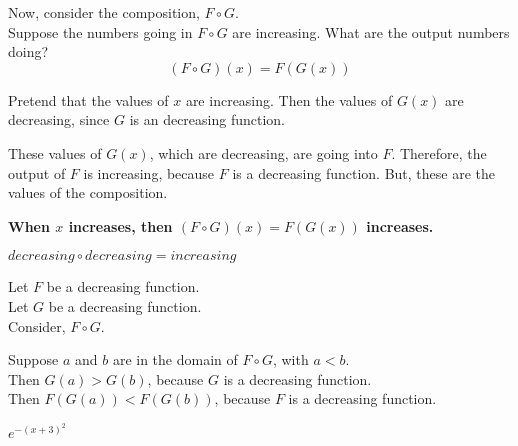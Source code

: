 \documentclass{ximera}
\begin{document}
Now, consider the composition, $F \circ G$. \\


Suppose the numbers going in $F \circ G$ are increasing.  What are the output numbers doing? \\




\[ (F \circ G)(x) = F(G(x)) \]


Pretend that the values of $x$ are increasing. Then the values of $G(x)$ are decreasing, since $G$ is an decreasing function.

These values of $G(x)$, which are decreasing, are going into $F$.  Therefore, the output of $F$ is increasing, because $F$ is a decreasing function.  But, these are the values of the composition.



\begin{center}
\textbf{\textcolor{red!70!black}{When $x$ increases, then $(F \circ G)(x) = F(G(x))$ increases.}}
\end{center}






\begin{fact}
$decreasing \circ decreasing = increasing$


Let $F$ be a decreasing function. \\
Let $G$ be a decreasing function. \\


Consider, $F \circ G$.

Suppose $a$ and $b$ are in the domain of $F \circ G$, with $a < b$. \\

Then $G(a) > G(b)$, because $G$ is a decreasing function. \\

Then $F(G(a)) < F(G(b))$, because $F$ is a decreasing function.


\end{fact}







\begin{example}   $e^{-(x+3)^2}$




\end{example}
\end{document}
